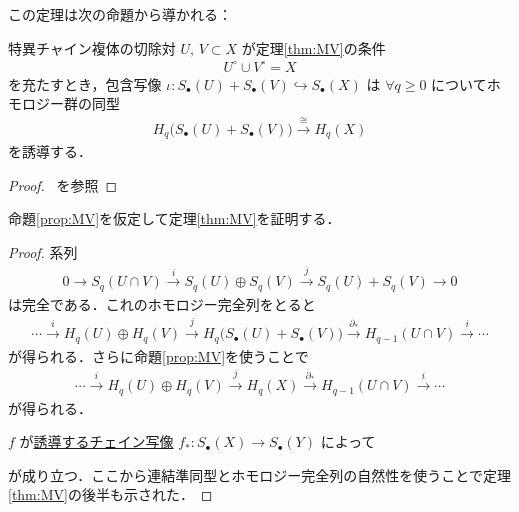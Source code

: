 \documentclass[algtopo_main]{subfiles}
\begin{document}
この定理は次の命題から導かれる：
\begin{myprop}[label=prop:MV]{特異チャイン複体の切除対}
    $U,\, V \subset X$ が定理\ref{thm:MV}の条件
    \begin{align}
        U^\circ \cup V^\circ = X
    \end{align}
    を充たすとき，包含写像 $\iota\colon  S_\bullet(U) + S_\bullet(V) \hookrightarrow S_\bullet(X)$ は $\forall q \ge 0$ についてホモロジー群の同型
    \begin{align}
        H_q \bigl( S_\bullet(U) + S_\bullet(V) \bigr) \xrightarrow{\cong} H_q(X)
    \end{align}
    を誘導する．
\end{myprop}

\begin{proof}
    ~\cite[定理2.4.2]{Nariya}を参照
\end{proof}


命題\ref{prop:MV}を仮定して定理\ref{thm:MV}を証明する．

\begin{proof}
    系列
    \begin{align}
        0 \to S_q(U \cap V) \xrightarrow{i} S_q(U) \oplus S_q(V) \xrightarrow{j} S_q(U) + S_q(V) \to 0
    \end{align}
    は完全である．これのホモロジー完全列をとると
    \begin{align}
        \cdots \xrightarrow{i} H_q(U) \oplus H_q(V) \xrightarrow{j} H_q \bigl( S_\bullet(U) + S_\bullet (V) \bigr) \xrightarrow{\partial_*} H_{q-1}(U\cap V) \xrightarrow{i} \cdots
    \end{align}
    が得られる．さらに命題\ref{prop:MV}を使うことで
    \begin{align}
        \cdots \xrightarrow{i} H_q(U) \oplus H_q(V) \xrightarrow{j} H_q (X) \xrightarrow{\partial_*} H_{q-1}(U\cap V) \xrightarrow{i} \cdots
    \end{align}
    が得られる．

    $f$ が\hyperref[lem:chain1]{誘導するチェイン写像} $f_* \colon S_\bullet(X) \longrightarrow S_\bullet(Y)$ によって
    \begin{figure}[H]
        \centering
    \end{figure}%
    が成り立つ．ここから連結準同型とホモロジー完全列の自然性を使うことで定理\ref{thm:MV}の後半も示された．
\end{proof}
\end{document}
